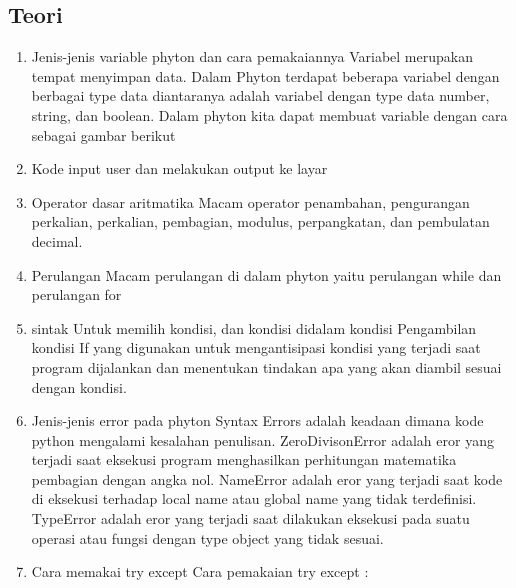 \subsection{Teori}
\begin{enumerate}
	\item Jenis-jenis variable phyton dan cara pemakaiannya
Variabel merupakan tempat menyimpan data. Dalam Phyton terdapat beberapa variabel dengan berbagai type data diantaranya adalah variabel dengan type data number, string, dan boolean. Dalam phyton kita dapat membuat variable dengan cara sebagai gambar berikut
   
	\item Kode input user dan melakukan output ke layar
 
	\item Operator dasar aritmatika
Macam operator penambahan, pengurangan perkalian, perkalian, pembagian, modulus, perpangkatan, dan pembulatan decimal.

	\item Perulangan
Macam perulangan di dalam phyton yaitu perulangan while dan perulangan for
 
 
	\item sintak Untuk memilih kondisi, dan kondisi didalam kondisi
Pengambilan kondisi If yang digunakan untuk mengantisipasi kondisi yang terjadi saat program dijalankan dan menentukan tindakan apa yang akan diambil sesuai dengan kondisi.
  
  
  

	\item Jenis-jenis error pada phyton
Syntax Errors adalah keadaan dimana kode python mengalami kesalahan penulisan. 
ZeroDivisonError adalah eror yang terjadi saat eksekusi program menghasilkan perhitungan matematika pembagian dengan angka nol.
NameError adalah eror yang terjadi saat kode di eksekusi terhadap local name atau global name yang tidak terdefinisi. 
TypeError adalah eror yang terjadi saat dilakukan eksekusi pada suatu operasi atau fungsi dengan type object yang tidak sesuai.

	\item Cara memakai try except
Cara pemakaian try except :


\end{enumerate}

